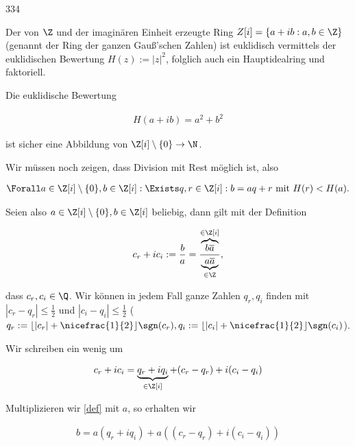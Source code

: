 \begin{algebraUE}{334}

Der von $\Z$ und der imaginären Einheit erzeugte Ring $Z[i] = \{a + ib: a,b \in \Z\}$
(genannt der Ring der ganzen Gauß'schen Zahlen) ist euklidisch vermittels der
euklidischen Bewertung $H(z) := |z|^2$, folglich auch ein Hauptidealring und faktoriell.

\end{algebraUE}

\begin{solution}

Die euklidische Bewertung

\begin{align*}
  H(a+ib) = a^2 + b^2
\end{align*}

ist sicher eine Abbildung von $\Z [i] \setminus \{0\} \to \N$.

Wir müssen noch zeigen, dass Division mit Rest möglich ist, also

\begin{align*}
  \Forall a \in \Z [i] \setminus \{0\}, b \in \Z [i]: \Exists q,r \in \Z [i]: b = aq + r \text{~mit~} H(r) < H(a).
\end{align*}

Seien also $a \in \Z [i] \setminus \{0\}, b \in \Z [i]$ beliebig, dann gilt mit der Definition

\begin{align}\label{def}
  c_r + i c_i := \frac{b}{a} = \frac{\overbrace{b\overline{a}}^{\in \Z[i]}}{\underbrace{a\overline{a}}_{\in \Z}},
\end{align}

dass $c_r, c_i \in \Q$. Wir können in jedem Fall ganze Zahlen $q_r, q_i$ finden mit $|c_r-q_r| \leq \frac{1}{2}$ und $|c_i-q_i| \leq \frac{1}{2}$
($q_r := \lfloor |c_r| + \nicefrac{1}{2}\rfloor\sgn(c_r), q_i := \lfloor |c_i| + \nicefrac{1}{2}\rfloor\sgn(c_i)$).

Wir schreiben ein wenig um

\begin{align*}
  c_r + i c_i = \underbrace{q_r + i q_i}_{\in \Z [i]} + (c_r- q_r) + i (c_i - q_i)
\end{align*}

Multiplizieren wir \eqref{def} mit $a$, so erhalten wir

\begin{align*}
  b = a(q_r + i q_i) + a((c_r- q_r) + i (c_i - q_i))
\end{align*}


\end{solution}
